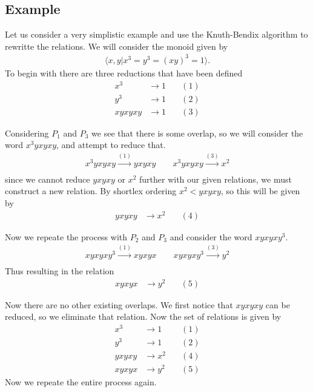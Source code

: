 \documentclass[10pt]{amsart}
\theoremstyle{definition}
\theoremstyle{remark}
\begin{document}
\subsection{Example}%
\label{sub:example}

Let us consider a very simplistic example and use the Knuth-Bendix algorithm to
rewritte the relations. We will consider the monoid given by
\begin{align*}
  \langle x,y\vert x^3=y^3={(xy)}^3=1\rangle.
\end{align*}
To begin with there are three reductions that have been defined
\begin{align*}
  x^3&\rightarrow1\quad&(1)\\
  y^3&\rightarrow1\quad&(2)\\
  xyxyxy&\rightarrow1\quad&(3)
\end{align*}

Considering $P_1$ and $P_3$ we see that there is some overlap, so we will
consider the word $x^3yxyxy$, and attempt to reduce that.
\begin{align*}
  x^3yxyxy\xrightarrow{(1)}yxyxy\quad\quad
  x^3yxyxy\xrightarrow{(3)}x^2\\
\end{align*}
since we cannot reduce $yxyxy$ or $x^2$ further with our given relations, we
must construct a new relation. By shortlex ordering $x^2<yxyxy$, so this will
be given by
\begin{align*}
  yxyxy&\rightarrow x^2\quad&(4)
\end{align*}

Now we repeate the process with $P_2$ and $P_3$ and consider the word
$xyxyxy^3$.
\begin{align*}
  xyxyxy^3\xrightarrow{(1)}xyxyx\quad\quad
  xyxyxy^3\xrightarrow{(3)}y^2\\
\end{align*}
Thus resulting in the relation
\begin{align*}
  xyxyx&\rightarrow y^2\quad&(5)
\end{align*}

Now there are no other existing overlaps. We first notice that $xyxyxy$ can be
reduced, so we eliminate that relation. Now the set of relations is given by
\begin{align*}
  x^3&\rightarrow1\quad&(1)\\
  y^3&\rightarrow1\quad&(2)\\
  yxyxy&\rightarrow x^2\quad&(4)\\
  xyxyx&\rightarrow y^2\quad&(5)
\end{align*}
Now we repeate the entire process again.
\end{document}
